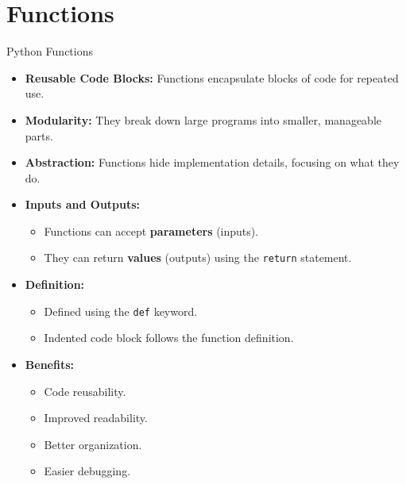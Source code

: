 \section{Functions}

\begin{frame}{Python Functions}
    \begin{itemize}
        \item \textbf{Reusable Code Blocks:} Functions encapsulate blocks of code for repeated use.
        \item \textbf{Modularity:} They break down large programs into smaller, manageable parts.
        \item \textbf{Abstraction:} Functions hide implementation details, focusing on what they do.
        \item \textbf{Inputs and Outputs:}
            \begin{itemize}
                \item Functions can accept \textbf{parameters} (inputs).
                \item They can return \textbf{values} (outputs) using the \texttt{return} statement.
            \end{itemize}
        \item \textbf{Definition:}
            \begin{itemize}
                \item Defined using the \texttt{def} keyword.
                \item Indented code block follows the function definition.
            \end{itemize}
        \item \textbf{Benefits:}
            \begin{itemize}
                \item Code reusability.
                \item Improved readability.
                \item Better organization.
                \item Easier debugging.
            \end{itemize}
    \end{itemize}
    
    \end{frame}



